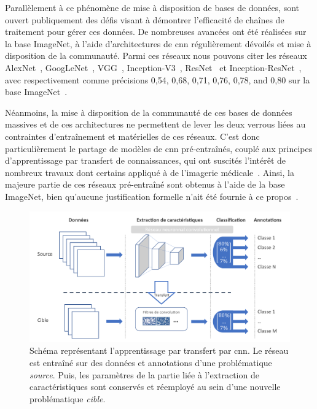 Parallèlement à ce phénomène de mise à disposition de bases de données, sont ouvert publiquement des défis visant à démontrer l'efficacité de chaînes de traitement pour gérer ces données. De nombreuses avancées ont été réalisées sur la base ImageNet, à l'aide d'architectures de \gls{cnn} régulièrement dévoilés et mise à disposition de la communauté. Parmi ces réseaux nous pouvons citer les réseaux AlexNet~\cite{Krizhevsky2012}, GoogLeNet~\cite{Szegedy2015}, VGG~\cite{Simonyan2014}, Inception-V3~\cite{Szegedy2016}, ResNet~\cite{He2016} et Inception-ResNet~\cite{Szegedy2017}, avec respectivement comme précisions 0,54, 0,68, 0,71, 0,76, 0,78, and 0,80 sur la base ImageNet~\cite{Canziani2016}.\par

Néanmoins, la mise à disposition de la communauté de ces bases de données massives et de ces architectures ne permettent de lever les deux verrous liées au contraintes d'entraînement et matérielles de ces réseaux. C'est donc particulièrement le partage de modèles de \gls{cnn} pré-entraînés, couplé aux principes d'apprentissage par transfert de connaissances, qui ont suscités l'intérêt de nombreux travaux dont certains appliqué à de l'imagerie médicale~\cite{Litjens2017}. Ainsi, la majeure partie de ces réseaux pré-entraîné sont obtenus à l'aide de la base ImageNet, bien qu'aucune justification formelle n'ait été fournie à ce propos~\cite{Huh2016}.\par
 
\begin{figure}[H]
    \centering
    \includegraphics[width=\linewidth]{contents/chapter_4/resources/scheme_transfer_learning.pdf}
    \caption{Schéma représentant l'apprentissage par transfert par \gls{cnn}. Le réseau est entraîné sur des données et annotations d'une problématique \textit{source}. Puis, les paramètres de la partie liée à l'extraction de caractéristiques sont conservés et réemployé au sein d'une nouvelle problématique \textit{cible}.}
    \label{fig:scheme_transfer_learning}
\end{figure}\par

